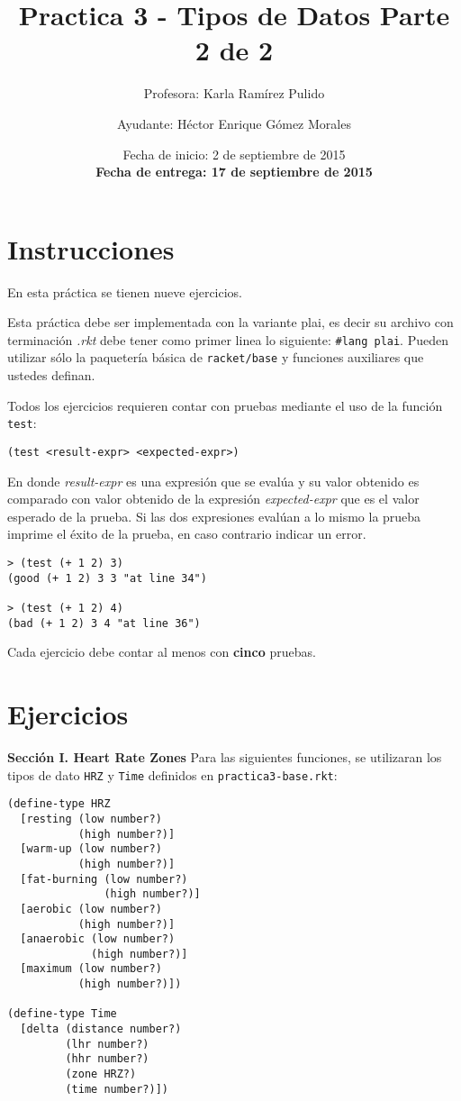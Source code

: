\documentclass{article}
\author{Profesora: Karla Ramírez Pulido \and
  Ayudante: Héctor Enrique Gómez Morales}
\title{Practica 3 - Tipos de Datos Parte 2 de 2}
\date{Fecha de inicio: 2 de septiembre de 2015\\
  \textbf{Fecha de entrega: 17 de septiembre de 2015}}
\begin{document}
\maketitle
\section{Instrucciones}
En esta práctica se tienen nueve ejercicios.

Esta práctica debe ser implementada con la variante plai, es decir
su archivo con terminación \textit{.rkt} debe tener como primer linea lo siguiente:
\texttt{\#lang plai}. Pueden utilizar sólo la paquetería básica de
\texttt{racket/base} y funciones auxiliares que ustedes definan.

Todos los ejercicios requieren contar con pruebas mediante el uso de
la función \texttt{test}:
\begin{verbatim}
(test <result-expr> <expected-expr>)
\end{verbatim}

En donde \textit{result-expr} es una expresión que se evalúa y su valor obtenido
es comparado con valor obtenido de la expresión \textit{expected-expr} que es el
valor esperado de la prueba. Si las dos expresiones evalúan a lo mismo la prueba
imprime el éxito de la prueba, en caso contrario indicar un error.

\begin{verbatim}
> (test (+ 1 2) 3)
(good (+ 1 2) 3 3 "at line 34")

> (test (+ 1 2) 4)
(bad (+ 1 2) 3 4 "at line 36")
\end{verbatim}

Cada ejercicio debe contar al menos con \textbf{cinco} pruebas.

\section{Ejercicios}
\textbf{Sección I. Heart Rate Zones} Para las siguientes funciones, se utilizaran los tipos de dato \verb;HRZ; y \verb;Time; definidos en \verb;practica3-base.rkt;:
\begin{verbatim}
(define-type HRZ
  [resting (low number?)
           (high number?)]
  [warm-up (low number?)
           (high number?)]
  [fat-burning (low number?)
               (high number?)]
  [aerobic (low number?)
           (high number?)]
  [anaerobic (low number?)
             (high number?)]
  [maximum (low number?)
           (high number?)])

(define-type Time
  [delta (distance number?)
         (lhr number?)
         (hhr number?)
         (zone HRZ?)
         (time number?)])
\end{verbatim}
\end{document}
